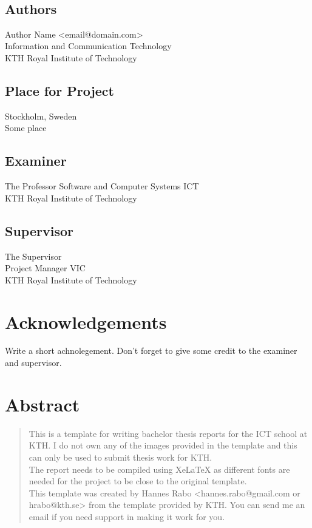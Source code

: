 \newpage
\thispagestyle{empty}
~\\
\vfill
{ 
\subsection*{Authors}
Author Name <email@domain.com>\\
Information and Communication Technology\\
KTH Royal Institute of Technology

\subsection*{Place for Project}
Stockholm, Sweden\\
Some place

\subsection*{Examiner}
The Professor
Software and Computer Systems ICT\\
KTH Royal Institute of Technology

\subsection*{Supervisor }
The Supervisor\\
Project Manager VIC\\
KTH Royal Institute of Technology
~

}

\newpage
\section*{Acknowledgements}
Write a short achnolegement. Don't forget to give some credit to the examiner and supervisor.






\newpage


\section*{Abstract}
\begin{abstract}
This is a template for writing bachelor thesis reports for the ICT school at KTH. I do not own any of the images provided in the template and this can only be used to submit thesis work for KTH.\\
The report needs to be compiled using XeLaTeX as different fonts are needed for the project to be close to the original template.\\
This template was created by Hannes Rabo <hannes.rabo@gmail.com or hrabo@kth.se> from the template provided by KTH. You can send me an email if you need support in making it work for you.


\end{abstract}

